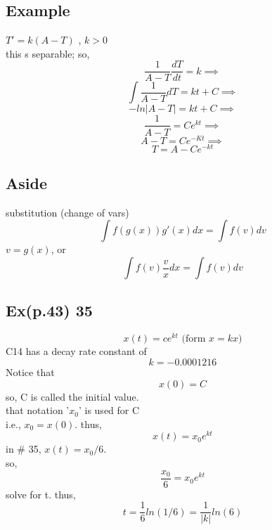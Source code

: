 \documentclass[10pt,a4paper]{article}
\begin{document}
\subsection*{Example}
$T' = k(A-T)$ , $k>0$ \\
this s separable; so,  \\
$$\frac{1}{A-T} \frac{dT}{dt} = k \implies $$
$$\int \frac{1}{A-T} dT = kt + C \implies$$
$$-ln|A-T| = kt + C \implies $$
$$\frac{1}{A-T} = Ce^{kt} \implies$$
$$A-T = Ce^{-Kt} \implies $$
$$T = A-Ce^{-kt}$$


\subsection*{Aside}
substitution (change of vars)
$$\int f(g(x))g'(x)dx = \int f(v)dv$$
$v=g(x)$, or
$$\int f(v)\frac{v}{x} dx = \int f(v)dv$$

\newpage 
{}
  \subsection*{Ex(p.43) 35}
  $$x(t)=ce^{kt} \text{ (form } x=kx)$$
  C14 has a decay rate constant of 
  $$k = -0.0001216$$
  Notice that 
  $$x(0) = C$$
  so, C is called the initial value. \\
  that notation '$x_0$' is used for C \\
  i.e., $x_0 = x(0)$. thus,  \\
  $$x(t)=x_0e^{kt}$$ 
  in \# 35, $x(t) = x_0/6.$ \\
  so, 
  $$\frac{x_0}{6}= x_0e^{kt}$$
  solve for t. thus, 
  $$t=\frac{1}{6}ln(1/6)=\frac{1}{|k|}ln(6)$$
  
\end{document}
